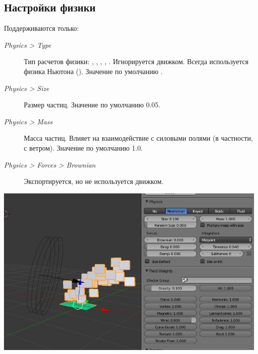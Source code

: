 \documentclass[a4paper,12pt,oneside]{sphinxmanual}
\begin{document}
\subsection{Настройки физики}
\label{particles:id10}
Поддерживаются только:
\begin{description}
\item[{\emph{Physics \textgreater{} Type}}] \leavevmode
Тип расчетов физики: , , , , . Игнорируется движком. Всегда используется физика Ньютона (). Значение по умолчанию .

\item[{\emph{Physics \textgreater{} Size}}] \leavevmode
Размер частиц. Значение по умолчанию 0.05.

\item[{\emph{Physics \textgreater{} Mass}}] \leavevmode
Масса частиц. Влияет на взаимодействие с силовыми полями (в частности, с ветром). Значение по умолчанию 1.0.

\item[{\emph{Physics \textgreater{} Forces \textgreater{} Brownian}}] \leavevmode
Экспортируется, но не используется движком.

\end{description}

{\hfill\includegraphics[width=1.000\linewidth]{particles_settings2.jpg}\hfill}
\end{document}
